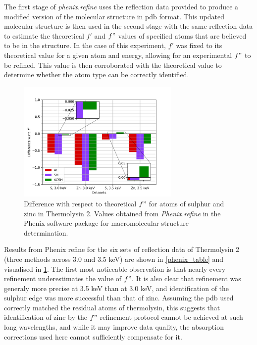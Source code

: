 The first stage of \textit{phenix.refine} uses the reflection data provided to produce a modified version of the molecular structure in \ac{pdb} format. This updated molecular structure is then used in the second stage with the same reflection data to estimate the theoretical $f'$ and $f"$ values of specified atoms that are believed to be in the structure. In the case of this experiment, $f'$ was fixed to its theoretical value for a given atom and energy, allowing for an experimental $f"$ to be refined. This value is then corroborated with the theoretical value to determine whether the atom type can be correctly identified.%


\begin{figure}[h]
    \centering
    \includegraphics[width = 0.7\textwidth]{plots/phenix_plot_Pat.png}
    \caption{Difference with respect to theoretical $f"$ for atoms of sulphur and zinc in Thermolysin 2. Values obtained from \textit{Phenix.refine} in the Phenix software package for macromolecular structure determination.}
    \label{fig:phenix_plot}
\end{figure}

Results from Phenix refine for the six sets of reflection data of Thermolysin 2 (three methods across 3.0 and 3.5 \unit{keV}) are shown in \cref{phenix_table} and visualised in \cref{fig:phenix_plot}. The first most noticeable observation is that nearly every refinement underestimates the value of $f"$. It is also clear that refinement was generaly more precise at 3.5 \unit{keV} than at 3.0 \unit{keV}, and identification of the sulphur edge was more successful than that of zinc. Assuming the \ac{pdb} used correctly matched the residual atoms of thermolysin, this suggests that identification of zinc by the $f"$ refinement protocol cannot be achieved at such long wavelengths, and while it may improve data quality, the absorption corrections used here cannot sufficiently compensate for it. %

